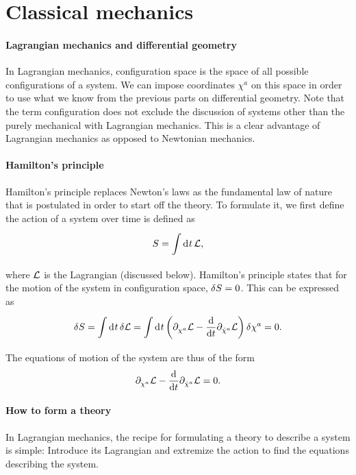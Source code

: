 \section{Classical mechanics}

\paragraph{Lagrangian mechanics and differential geometry}
In Lagrangian mechanics, configuration space is the space of all possible configurations of a system. We can impose coordinates $\chi^{a}$ on this space in order to use what we know from the previous parts on differential geometry. Note that the term configuration does not exclude the discussion of systems other than the purely mechanical with Lagrangian mechanics. This is a clear advantage of Lagrangian mechanics as opposed to Newtonian mechanics.

\paragraph{Hamilton's principle}
Hamilton's principle replaces Newton's laws as the fundamental law of nature that is postulated in order to start off the theory. To formulate it, we first define the action of a system over time is defined as
\begin{align*}
	S = \int\limits_{}^{}\dd[]{t}\mathcal{L},
\end{align*}
where $\mathcal{L}$ is the Lagrangian (discussed below). Hamilton's principle states that for the motion of the system in configuration space, $\delta S = 0$. This can be expressed as
\begin{align*}
	\delta S = \int\limits_{}^{}\dd[]{t}\delta \mathcal{L} = \int\limits_{}^{}\dd[]{t}\left(\partial^{}_{\chi^{a}}\mathcal{L} - \dv{t}\partial^{}_{\dot{\chi}^{a}}\mathcal{L}\right)\delta \chi^{a} = 0.
\end{align*}
The equations of motion of the system are thus of the form
\begin{align*}
	\partial^{}_{\chi^{a}}\mathcal{L} - \dv{t}\partial^{}_{\dot{\chi}^{a}}\mathcal{L} = 0.
\end{align*}

\paragraph{How to form a theory}
In Lagrangian mechanics, the recipe for formulating a theory to describe a system is simple: Introduce its Lagrangian and extremize the action to find the equations describing the system.

